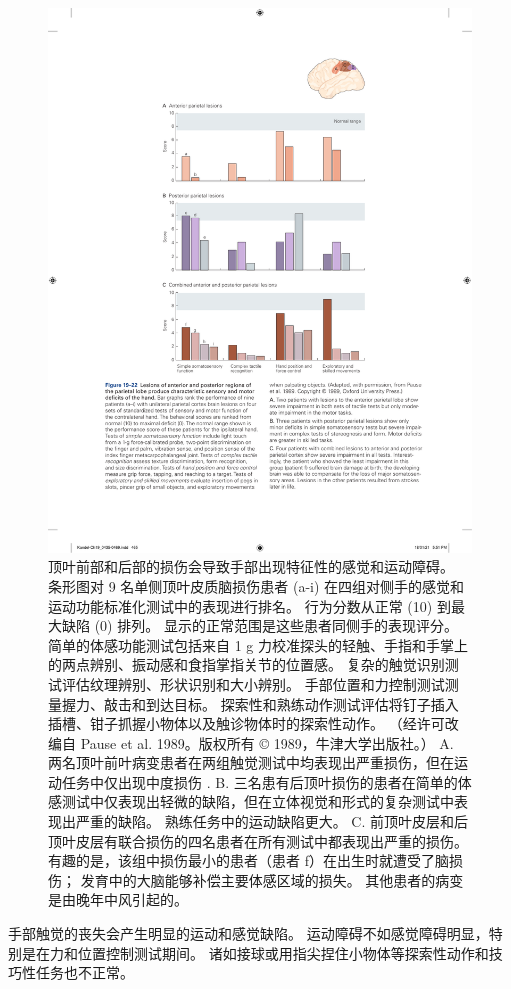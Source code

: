 \begin{figure}[htbp]
	\centering
	\includegraphics[width=0.7\linewidth]{chap19/fig_19_22}
	\caption{顶叶前部和后部的损伤会导致手部出现特征性的感觉和运动障碍。 
		条形图对 9 名单侧顶叶皮质脑损伤患者 (a-i) 在四组对侧手的感觉和运动功能标准化测试中的表现进行排名。 
		行为分数从正常 (10) 到最大缺陷 (0) 排列。 
		显示的正常范围是这些患者同侧手的表现评分。 
		简单的体感功能测试包括来自 1 g 力校准探头的轻触、手指和手掌上的两点辨别、振动感和食指掌指关节的位置感。 
		复杂的触觉识别测试评估纹理辨别、形状识别和大小辨别。 
		手部位置和力控制测试测量握力、敲击和到达目标。 
		探索性和熟练动作测试评估将钉子插入插槽、钳子抓握小物体以及触诊物体时的探索性动作。 （经许可改编自 Pause et al. 1989。版权所有 © 1989，牛津大学出版社。） 
		A. 两名顶叶前叶病变患者在两组触觉测试中均表现出严重损伤，但在运动任务中仅出现中度损伤 . 
		B. 三名患有后顶叶损伤的患者在简单的体感测试中仅表现出轻微的缺陷，但在立体视觉和形式的复杂测试中表现出严重的缺陷。 熟练任务中的运动缺陷更大。
		C. 前顶叶皮层和后顶叶皮层有联合损伤的四名患者在所有测试中都表现出严重的损伤。 有趣的是，该组中损伤最小的患者（患者 f）在出生时就遭受了脑损伤； 发育中的大脑能够补偿主要体感区域的损失。 其他患者的病变是由晚年中风引起的。}
	\label{fig:19_22}
\end{figure}

手部触觉的丧失会产生明显的运动和感觉缺陷。 
运动障碍不如感觉障碍明显，特别是在力和位置控制测试期间。 
诸如接球或用指尖捏住小物体等探索性动作和技巧性任务也不正常。


